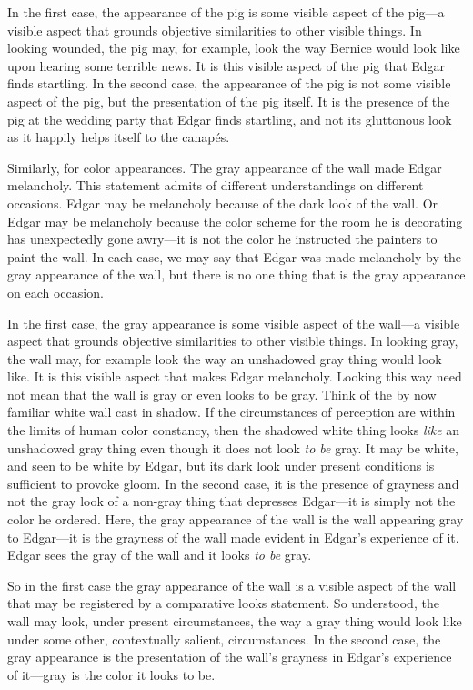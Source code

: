 \documentclass[12pt]{article}
\begin{document}
In the first case, the appearance of the pig is some visible aspect of the pig---a visible aspect that grounds objective similarities to other visible things. In looking wounded, the pig may, for example, look the way Bernice would look like upon hearing some terrible news. It is this visible aspect of the pig that Edgar finds startling. In the second case, the appearance of the pig is not some visible aspect of the pig, but the presentation of the pig itself. It is the presence of the pig at the wedding party that Edgar finds startling, and not its gluttonous look as it happily helps itself to the canapés.

Similarly, for color appearances. The gray appearance of the wall made Edgar melancholy. This statement admits of different understandings on different occasions. Edgar may be melancholy because of the dark look of the wall. Or Edgar may be melancholy because the color scheme for the room he is decorating has unexpectedly gone awry---it is not the color he instructed the painters to paint the wall. In each case, we may say that Edgar was made melancholy by the gray appearance of the wall, but there is no one thing that is the gray appearance on each occasion.

In the first case, the gray appearance is some visible aspect of the wall---a visible aspect that grounds objective similarities to other visible things. In looking gray, the wall may, for example look the way an unshadowed gray thing would look like. It is this visible aspect that makes Edgar melancholy. Looking this way need not mean that the wall is gray or even looks to be gray. Think of the by now familiar white wall cast in shadow. If the circumstances of perception are within the limits of human color constancy, then the shadowed white thing looks \emph{like} an unshadowed gray thing even though it does not look \emph{to be} gray. It may be white, and seen to be white by Edgar, but its dark look under present conditions is sufficient to provoke gloom. In the second case, it is the presence of grayness and not the gray look of a non-gray thing that depresses Edgar---it is simply not the color he ordered. Here, the gray appearance of the wall is the wall appearing gray to Edgar---it is the grayness of the wall made evident in Edgar's experience of it. Edgar sees the gray of the wall and it looks \emph{to be} gray.

So in the first case the gray appearance of the wall is a visible aspect of the wall that may be registered by a comparative looks statement. So understood, the wall may look, under present circumstances, the way a gray thing would look like under some other, contextually salient, circumstances. In the second case, the gray appearance is the presentation of the wall's grayness in Edgar's experience of it---gray is the color it looks to be.
\end{document}
